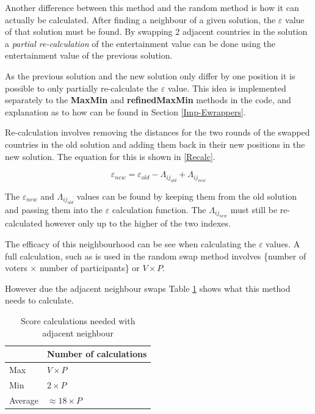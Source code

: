 \documentclass[12pt]{report}
\begin{document}
Another difference between this method and the random method is how it can actually be calculated. After finding a neighbour of a given solution, the $\varepsilon$ value of that solution must be found. By swapping 2 adjacent countries in the solution a \textit{partial re-calculation} of the entertainment value can be done using the entertainment value of the previous solution. 

As the previous solution and the new solution only differ by one position it is possible to only partially re-calculate the $\varepsilon$ value. This idea is implemented separately to the \textbf{MaxMin} and \textbf{refinedMaxMin} methods in the code, and explanation as to how can be found in Section \ref{Imp-Ewrappers}.

Re-calculation involves removing the distances for the two rounds of the swapped countries in the old solution and adding them back in their new positions in the new solution. The equation for this is shown in \ref{Recalc}.

\begin{equation}\label{Recalc}
	\varepsilon_{new} = \varepsilon_{old} - \Lambda_{ij_{old}} + \Lambda_{ij_{new}}
\end{equation}

The $\varepsilon_{new}$ and $\Lambda_{ij_{old}}$ values can be found by keeping them from the old solution and passing them into the $\varepsilon$ calculation function. The $\Lambda_{ij_{new}}$ must still be re-calculated however only up to the higher of the two indexes.

The efficacy of this neighbourhood can be see when calculating the $\varepsilon$ values. A full calculation, such as is used in the random swap method involves \{number of voters $\times$ number of participants\} or $V \times P$. 

However due the adjacent neighbour swaps Table \ref{scoreCalcsAdj} shows what this method needs to calculate.

\begin{table}[H]
\centering
\caption{Score calculations needed with adjacent neighbour}
\label{scoreCalcsAdj}
\begin{tabular}{|l|l|}
\hline
        & Number of calculations \\ \hline
Max     & $V \times P$           \\ \hline
Min     & $2 \times P$           \\ \hline
Average & $\approx 18 \times P$          \\ \hline
\end{tabular}
\end{table}
\end{document}

